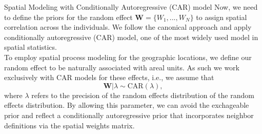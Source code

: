 \documentclass[a4paper, 12pt]{article}
\makeatletter
\renewcommand{\section}{\@startsection
	{section}    {1}    {0mm}    {-0.7\baselineskip}    {0.08\baselineskip}    {\normalfont\large\sc\center\bf}}
\makeatother
\begin{document}
\section{Spatial Modeling with Conditionally Autoregressive (CAR) model}
\noindent Now, we need to define the priors for the random effect $\mathbf{W}=\{W_1,...,W_N\}$ to assign spatial correlation across the individuals. We follow the canonical approach and apply conditionally autoregressive (CAR) model, one of the most widely used model in spatial statistics.\\ \newline
To employ spatial process modeling for the geographic locations, we define our random effect to be naturally associated with
areal units. As such we work exclusively with CAR models for these effects, i.e., we assume
that
\begin{equation}
\mathbf{W}|\lambda \sim \mbox{CAR}(\lambda),
\end{equation}
where $\lambda$ refers to the precision of the random effects distribution of the random effects distribution. By allowing this parameter, we can avoid the exchageable prior and reflect a conditionally autoregressive prior that incorporates neighbor definitions via the spatial weights matrix.
\end{document}
